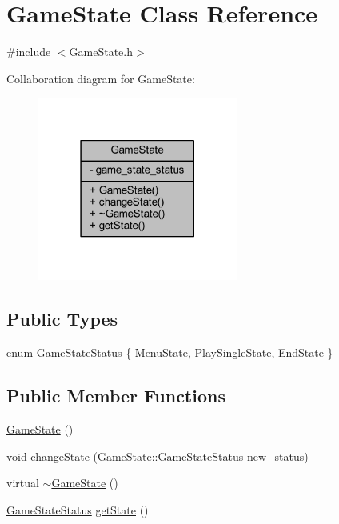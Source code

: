 \hypertarget{class_game_state}{}\section{Game\+State Class Reference}
\label{class_game_state}


{\ttfamily \#include $<$Game\+State.\+h$>$}



Collaboration diagram for Game\+State\+:
\nopagebreak
\begin{figure}[H]
\begin{center}
\leavevmode
\includegraphics[width=186pt]{class_game_state__coll__graph}
\end{center}
\end{figure}
\subsection*{Public Types}
\begin{DoxyCompactItemize}
\item 
enum \hyperlink{class_game_state_a921b00cc8c4eb15a3ae9f5061f44bd85}{Game\+State\+Status} \{ \hyperlink{class_game_state_a921b00cc8c4eb15a3ae9f5061f44bd85a51f924895923aaa37adfe55a15929e84}{Menu\+State}, 
\hyperlink{class_game_state_a921b00cc8c4eb15a3ae9f5061f44bd85ac2cc6ee014ef8d373d158e5be10a2c08}{Play\+Single\+State}, 
\hyperlink{class_game_state_a921b00cc8c4eb15a3ae9f5061f44bd85a3470235edc7f9177b35063100d4117ee}{End\+State}
 \}
\end{DoxyCompactItemize}
\subsection*{Public Member Functions}
\begin{DoxyCompactItemize}
\item 
\hyperlink{class_game_state_a4fa0a2bf50315c4a35a3890a0adcee5c}{Game\+State} ()
\item 
void \hyperlink{class_game_state_a9f10dd6cb64501f748c31a9f7ecc3466}{change\+State} (\hyperlink{class_game_state_a921b00cc8c4eb15a3ae9f5061f44bd85}{Game\+State\+::\+Game\+State\+Status} new\+\_\+status)
\item 
virtual \hyperlink{class_game_state_ae623df5042cd0c17daa3394fdcb397b3}{$\sim$\+Game\+State} ()
\item 
\hyperlink{class_game_state_a921b00cc8c4eb15a3ae9f5061f44bd85}{Game\+State\+Status} \hyperlink{class_game_state_a9b808c211f0155b3d2994ec1e2c32f33}{get\+State} ()
\end{DoxyCompactItemize}
